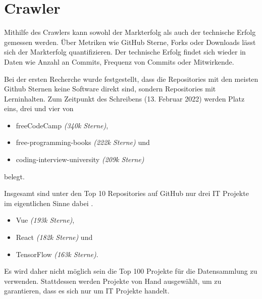 \chapter{Crawler}




Mithilfe des Crawlers kann sowohl der Markterfolg als auch der technische Erfolg gemessen werden.
Über Metriken wie GitHub Sterne, Forks oder Downloads lässt sich der Markterfolg quantifizieren.
Der technische Erfolg findet sich wieder in Daten wie Anzahl an Commits, Frequenz von Commits oder Mitwirkende.

Bei der ersten Recherche wurde festgestellt, dass die Repositories mit den meisten Github Sternen
keine Software direkt sind, sondern Repositories mit Lerninhalten.
Zum Zeitpunkt des Schreibens (13. Februar 2022) werden Platz eins, drei und vier von
\begin{itemize}
    \item freeCodeCamp \textit{(340k Sterne)},
    \item free-programming-books \textit{(222k Sterne)} und
    \item coding-interview-university \textit{(209k Sterne)}
\end{itemize}
belegt.

\bigskip

\noindent
Insgesamt sind unter den Top 10 Repositories auf GitHub nur drei IT Projekte im eigentlichen
Sinne dabei \cite{TopGitHubProjects}.
\begin{itemize}
    \item Vue \textit{(193k Sterne)},
    \item React \textit{(182k Sterne)} und
    \item TensorFlow \textit{(163k Sterne)}.
\end{itemize}


\bigskip
\noindent
Es wird daher nicht möglich sein die Top 100 Projekte für die Datensammlung zu verwenden.
Stattdessen werden Projekte von Hand ausgewählt, um zu garantieren, dass es sich nur um IT Projekte handelt.


